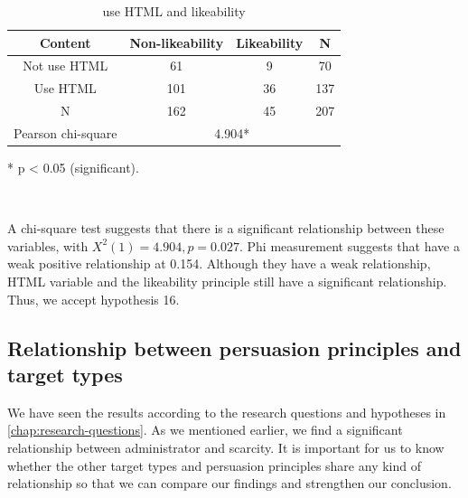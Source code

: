 \begin{minipage}[t]{1\columnwidth}%
\begin{longtable}{cccc}
\caption{\label{tab:use-HTML-and}use HTML and likeability}
\tabularnewline
\toprule 
{\footnotesize{}Content} & {\footnotesize{}Non-likeability} & {\footnotesize{}Likeability} & \multirow{1}{*}{{\footnotesize{}N}}\tabularnewline
\midrule 
\multirow{1}{*}{{\footnotesize{}Not use HTML}} & {\footnotesize{}61} & {\footnotesize{}9} & \multirow{1}{*}{{\footnotesize{}70}}\tabularnewline
\midrule 
\multirow{1}{*}{{\footnotesize{}Use HTML}} & {\footnotesize{}101} & {\footnotesize{}36} & \multirow{1}{*}{{\footnotesize{}137}}\tabularnewline
\midrule 
{\footnotesize{}N} & {\footnotesize{}162} & {\footnotesize{}45} & {\footnotesize{}207}\tabularnewline
\midrule 
{\footnotesize{}Pearson chi-square} & \multicolumn{3}{c}{{\footnotesize{}4.904{*}}}\tabularnewline
\midrule
\end{longtable}%
\end{minipage}

{*} p < 0.05 (significant).

\ 

A chi-square test suggests that there is a significant relationship
between these variables, with $X^{2}(1)=4.904,p=0.027$. Phi measurement
suggests that have a weak positive relationship at 0.154. Although
they have a weak relationship, HTML variable and the likeability principle
still have a significant relationship. Thus, we accept hypothesis
16.


\subsection{\label{sub:Relationship-between-persuasion}Relationship between
persuasion principles and target types}

We have seen the results according to the research questions and hypotheses
in \autoref{chap:research-questions}. As we mentioned earlier, we
find a significant relationship between administrator and scarcity.
It is important for us to know whether the other target types and
persuasion principles share any kind of relationship so that we can
compare our findings and strengthen our conclusion. 

